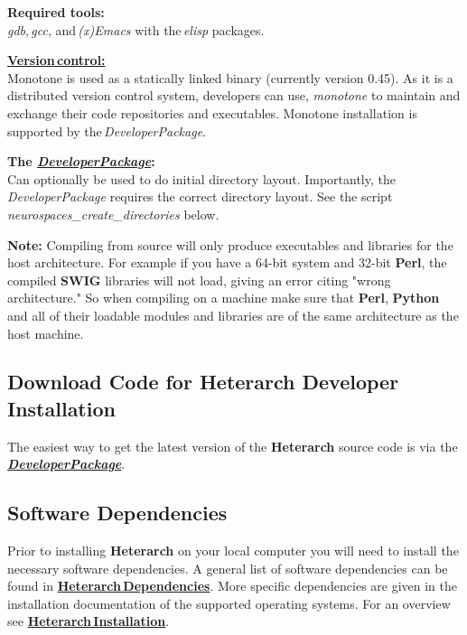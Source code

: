 \documentclass[12pt]{article}
\begin{document}
\begin{description}
\item {\bf Required tools:}\\
{\it gdb},\,{\it gcc}, and\,{\it (x)Emacs} with the\,{\it elisp} packages.
\item \href{../version-control/version-control.tex}{{\bf Version\,control:}}\\
Monotone is used as a statically linked binary (currently version 0.45). As it is a distributed version control system, developers can use, {\it monotone} to maintain and exchange their code repositories and executables. Monotone installation is supported by the\,{\it DeveloperPackage}. 
\item {\bf  The \href{../developer-package/developer-package.tex}{\emph{DeveloperPackage}}:}\\
Can optionally be used to do initial directory layout. Importantly, the\,{\it DeveloperPackage} requires the correct directory layout. See the script {\it neurospaces\_create\_directories} below.
\end{description}
{\bf Note:} Compiling from source will only produce executables and libraries for the host architecture. For example if you have a 64-bit system and 32-bit {\bf Perl}, the compiled {\bf SWIG} libraries will not load, giving an error citing "wrong architecture." So when compiling on a machine make sure that {\bf Perl}, {\bf Python} and all of their loadable modules and libraries are of the same architecture as the host machine.

\subsection*{Download Code for Heterarch Developer Installation}


The easiest way to get the latest version of the {\bf\small{Heterarch}} source code is via the  \href{../developer-package/developer-package.tex}{\bf{\emph{DeveloperPackage}}}.

\subsection*{Software Dependencies}

Prior to installing {\bf\small{Heterarch}} on your local computer you will need to install the necessary software dependencies. A general list of software dependencies can be found in \href{../heterarch-dependencies/heterarch-dependencies.tex}{\bf Heterarch\,Dependencies}. More specific dependencies are given in the installation documentation of the supported operating systems. For an overview see \href{../heterarch-installation/heterarch-installation.tex}{\bf Heterarch\,Installation}.
\end{document}
